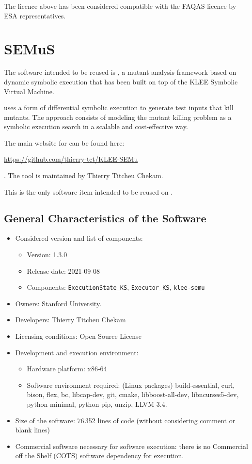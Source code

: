 The licence above has been considered compatible with the FAQAS licence by ESA representatives.

\section{SEMuS}
\label{sec:semus:reuse}

The software intended to be reused is \SEMU, a mutant analysis framework based on dynamic symbolic execution that has been built on top of the KLEE Symbolic Virtual Machine.

\SEMU uses a form of differential symbolic execution to generate test inputs that kill mutants. The approach consists of modeling the mutant killing problem as a symbolic execution search in a scalable and cost-effective way.

The main website for \SEMU can be found here: \begin{scriptsize}\url{https://github.com/thierry-tct/KLEE-SEMu}\end{scriptsize}. The tool is maintained by Thierry Titcheu Chekam.

This is the only software item intended to be reused on \SEMUS.

\subsection{General Characteristics of the Software}

\begin{itemize}
	\item Considered version and list of components:
	\begin{itemize}
		\item Version: 1.3.0
		\item Release date: 2021-09-08
		\item Components: \texttt{ExecutionState\_KS}, \texttt{Executor\_KS}, \texttt{klee-semu}
	\end{itemize}
	\item Owners: Stanford University.
	\item Developers: Thierry Titcheu Chekam
	\item Licensing conditions: Open Source License
	\item Development and execution environment:
	\begin{itemize}
		\item Hardware platform: x86-64
		\item Software environment required: (Linux packages) build-essential, curl, bison, flex, bc, libcap-dev, git, cmake, libboost-all-dev, libncurses5-dev, python-minimal, python-pip, unzip, LLVM 3.4.
	\end{itemize}
	\item Size of the software: 76\,352 lines of code (without considering comment or blank lines)
	\item Commercial software necessary for software execution: there is no Commercial off the Shelf (COTS) software dependency for execution.
\end{itemize}

